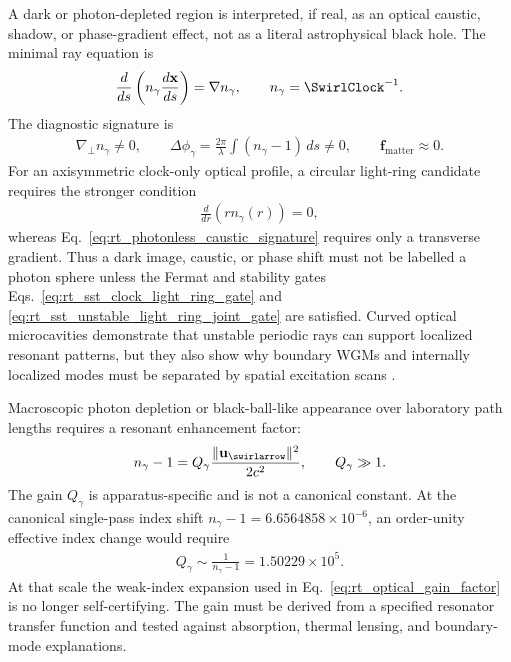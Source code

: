 A dark or photon-depleted region is interpreted, if real, as an optical caustic,
shadow, or phase-gradient effect, not as a literal astrophysical black hole. The
minimal ray equation is
\begin{align}
    \frac{d}{ds}
    \left(
    n_\gamma\frac{d\mathbf{x}}{ds}
    \right)
    =
    \nabla n_\gamma,
    \qquad
    n_\gamma=\SwirlClock^{-1}.
    \label{eq:rt_photonless_caustic_ray}
\end{align}
The diagnostic signature is
\begin{align}
    \nabla_\perp n_\gamma\neq0,
    \qquad
    \Delta\phi_\gamma
    =
    \frac{2\pi}{\lambda}
    \int(n_\gamma-1)\,ds
    \neq0,
    \qquad
    \mathbf{f}_{\mathrm{matter}}\approx0.
    \label{eq:rt_photonless_caustic_signature}
\end{align}
For an axisymmetric clock-only optical profile, a circular light-ring candidate
requires the stronger condition
\begin{align}
    \boxed{
    \frac{d}{dr}\left(rn_\gamma(r)\right)=0,
    }
    \label{eq:rt_photonless_light_ring_guard}
\end{align}
whereas Eq.~\eqref{eq:rt_photonless_caustic_signature} requires only a
transverse gradient.  Thus a dark image, caustic, or phase shift must not be
labelled a photon sphere unless the Fermat and stability gates
Eqs.~\eqref{eq:rt_sst_clock_light_ring_gate} and
\eqref{eq:rt_sst_unstable_light_ring_joint_gate} are satisfied.  Curved optical
microcavities demonstrate that unstable periodic rays can support localized
resonant patterns, but they also show why boundary WGMs and internally localized
modes must be separated by spatial excitation scans \cite{XuEtAl2026PhotonSphereModes}.

Macroscopic photon depletion or black-ball-like appearance over laboratory path
lengths requires a resonant enhancement factor:
\begin{align}
    n_\gamma-1
    =
    Q_\gamma
    \frac{\lVert\mathbf{u}_{\swirlarrow}\rVert^2}{2c^2},
    \qquad
    Q_\gamma\gg1.
    \label{eq:rt_optical_gain_factor}
\end{align}
The gain \(Q_\gamma\) is apparatus-specific and is not a canonical constant.
At the canonical single-pass index shift
\(n_\gamma-1=6.6564858\times10^{-6}\), an order-unity effective index
change would require
\begin{align}
    Q_\gamma
    \sim
    \frac{1}{n_\gamma-1}
    =
    1.50229\times10^5.
    \label{eq:rt_optical_gain_order_unity_guard}
\end{align}
At that scale the weak-index expansion used in
Eq.~\eqref{eq:rt_optical_gain_factor} is no longer self-certifying.  The gain
must be derived from a specified resonator transfer function and tested against
absorption, thermal lensing, and boundary-mode explanations.

